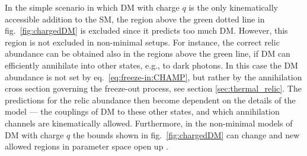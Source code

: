 In the simple scenario in which DM with charge $q$ is the only kinematically accessible addition to the SM, the region above the green dotted line in fig.~\ref{fig:chargedDM} is excluded since it predicts too much DM. However, this region is not excluded in non-minimal setups. For instance, the correct relic abundance can be obtained also in the regions above the green line, if DM can efficiently annihilate into other states, e.g., to dark photons. In this case the DM abundance is not set by eq.~\eqref{eq:freeze-in:CHAMP}, but rather by the annihilation cross section governing the freeze-out process, see section \ref{sec:thermal_relic}. The predictions for the relic abundance then become dependent on the details of the model --- the couplings of DM to these other states, and which annihilation channels are kinematically allowed. Furthermore, in the non-minimal models of DM with charge $q$ the bounds shown in fig.~\ref{fig:chargedDM}  can change and new allowed regions in parameter space open up \cite{nonminimalCHAMP}. 



